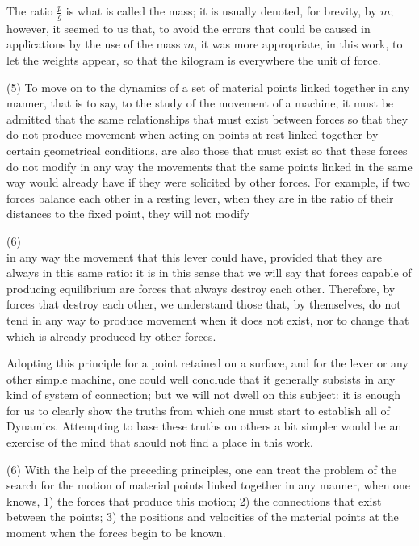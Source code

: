 \documentclass{book}
\begin{document}
The ratio \( \frac{p}{g} \) is what is called the mass; it is usually denoted, for brevity, by \( m \); however, it seemed to us that, to avoid the errors that could be caused in applications by the use of the mass \( m \), it was more appropriate, in this work, to let the weights appear, so that the kilogram is everywhere the unit of force.

(5) To move on to the dynamics of a set of material points linked together in any manner, that is to say, to the study of the movement of a machine, it must be admitted that the same relationships that must exist between forces so that they do not produce movement when acting on points at rest linked together by certain geometrical conditions, are also those that must exist so that these forces do not modify in any way the movements that the same points linked in the same way would already have if they were solicited by other forces. For example, if two forces balance each other in a resting lever, when they are in the ratio of their distances to the fixed point, they will not modify 



\newpage
(6)\\
in any way the movement that this lever could have, provided that they are always in this same ratio: it is in this sense that we will say that forces capable of producing equilibrium are forces that always destroy each other.
Therefore, by forces that destroy each other, we understand those that, by themselves, do not tend in any way to produce movement when it does not exist, nor to change that which is already produced by other forces.

Adopting this principle for a point retained on a surface, and for the lever or any other simple machine, one could well conclude that it generally subsists in any kind of system of connection; but we will not dwell on this subject: it is enough for us to clearly show the truths from which one must start to establish all of Dynamics. Attempting to base these truths on others a bit simpler would be an exercise of the mind that should not find a place in this work.

(6) With the help of the preceding principles, one can treat the problem of the search for the motion of material points linked together in any manner, when one knows, 1) the forces that produce this motion; 2) the connections that exist between the points; 3) the positions and velocities of the material points at the moment when the forces begin to be known.
\end{document}
